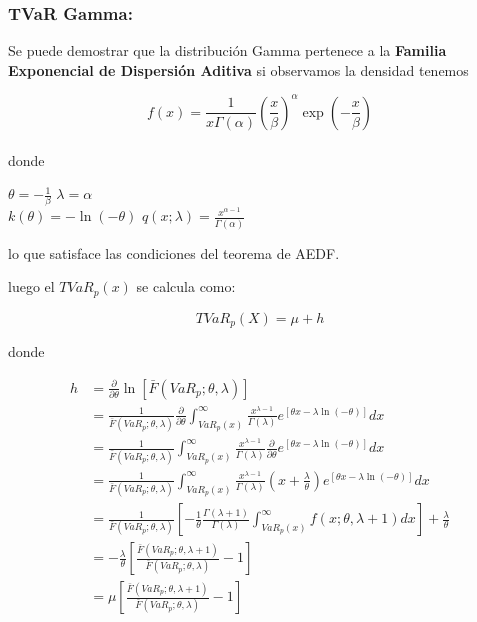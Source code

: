 \documentclass[]{article}
\begin{document}
\hypertarget{tvar-gamma}{%
\subsubsection{\texorpdfstring{\textbf{TVaR
Gamma:}}{TVaR Gamma:}}\label{tvar-gamma}}

Se puede demostrar que la distribución Gamma pertenece a la
\textbf{Familia Exponencial de Dispersión Aditiva} si observamos la
densidad tenemos

\[f(x)=\frac{1}{x \Gamma(\alpha)} \left(\frac{x}{\beta}\right)^{\alpha} \exp \left(-\frac{x}{\beta}\right)\]\\
donde

\(\theta=-\frac{1}{\beta}\) \(\lambda=\alpha\)\\
\(k(\theta) = -\ln(-\theta)\)
\(q(x;\lambda)=\frac{x^{\alpha-1}}{\Gamma(\alpha)}\)

lo que satisface las condiciones del teorema de AEDF.

luego el \(TVaR_p(x)\) se calcula como:

\[TVaR_p(X)= \mu + h\]

donde

\[\begin{array}{rl}
h &\displaystyle=\frac{\partial}{\partial \theta}\ln[\bar{F}(VaR_p;\theta,\lambda)]\\
&\displaystyle= \frac{1}{\bar{F}(VaR_p;\theta,\lambda)} \frac{\partial}{\partial \theta} \int_{VaR_p(x)}^{\infty} \frac{x^{\lambda-1}}{\Gamma(\lambda)} e^{[\theta x -\lambda \ln(-\theta)]}dx\\
&\displaystyle= \frac{1}{\bar{F}(VaR_p;\theta,\lambda)}  \int_{VaR_p(x)}^{\infty} \frac{x^{\lambda-1}}{\Gamma(\lambda)} \frac{\partial}{\partial \theta}e^{[\theta x -\lambda \ln(-\theta)]}dx\\
&\displaystyle= \frac{1}{\bar{F}(VaR_p;\theta,\lambda)}  \int_{VaR_p(x)}^{\infty} \frac{x^{\lambda-1}}{\Gamma(\lambda)} \left(x + \frac{\lambda}{\theta}\right)e^[\theta x -\lambda \ln(-\theta)]dx\\
&\displaystyle= \frac{1}{\bar{F}(VaR_p;\theta,\lambda)} \left[-\frac{1}{\theta} \frac{\Gamma(\lambda + 1)}{\Gamma(\lambda)} \int_{VaR_p(x)}^{\infty} f(x;\theta, \lambda + 1) dx \right] + \frac{\lambda}{\theta}\\
&\displaystyle= -\frac{\lambda}{\theta} \left[\frac{\bar{F}(VaR_p;\theta,\lambda+1)}{\bar{F}(VaR_p;\theta,\lambda)} - 1\right]\\
&\displaystyle= \mu \left[\frac{\bar{F}(VaR_p;\theta,\lambda+1)}{\bar{F}(VaR_p;\theta,\lambda)} - 1\right]
\end{array}\]
\end{document}
